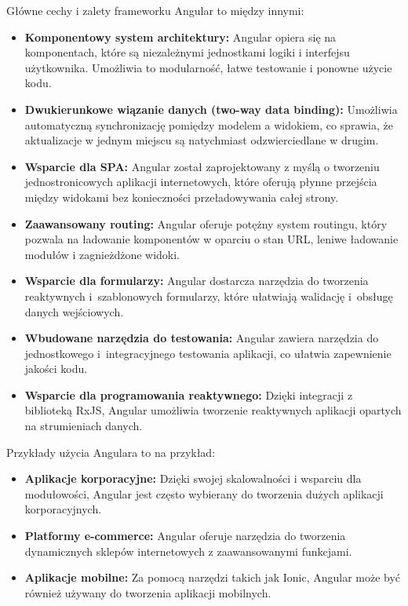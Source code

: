 Główne cechy i zalety frameworku Angular to między innymi:
\begin{itemize}
\item \textbf{Komponentowy system architektury:} Angular opiera się na komponentach, które są niezależnymi jednostkami logiki i interfejsu użytkownika. Umożliwia to modularność, łatwe testowanie i ponowne użycie kodu.

\item \textbf{Dwukierunkowe wiązanie danych (two-way data binding):} Umożliwia automatyczną synchronizację pomiędzy modelem a widokiem, co sprawia, że aktualizacje w jednym miejscu są natychmiast odzwierciedlane w drugim.

\item \textbf{Wsparcie dla SPA:} Angular został zaprojektowany z myślą o tworzeniu jednostronicowych aplikacji internetowych, które oferują płynne przejścia między widokami bez konieczności przeładowywania całej strony.

\item \textbf{Zaawansowany routing:} Angular oferuje potężny system routingu, który pozwala na ładowanie komponentów w oparciu o stan URL, leniwe ładowanie modułów i zagnieżdżone widoki.

\item \textbf{Wsparcie dla formularzy:} Angular dostarcza narzędzia do tworzenia reaktywnych i~szablonowych formularzy, które ułatwiają walidację i~obsługę danych wejściowych.

\item \textbf{Wbudowane narzędzia do testowania:} Angular zawiera narzędzia do jednostkowego i~integracyjnego testowania aplikacji, co ułatwia zapewnienie jakości kodu.

\item \textbf{Wsparcie dla programowania reaktywnego:} Dzięki integracji z biblioteką RxJS, Angular umożliwia tworzenie reaktywnych aplikacji opartych na strumieniach danych.
\end{itemize}

Przykłady użycia Angulara to na przykład:
\begin{itemize}
\item \textbf{Aplikacje korporacyjne:} Dzięki swojej skalowalności i wsparciu dla modułowości, Angular jest często wybierany do tworzenia dużych aplikacji korporacyjnych.

\item \textbf{Platformy e-commerce:} Angular oferuje narzędzia do tworzenia dynamicznych sklepów internetowych z zaawansowanymi funkcjami.

\item \textbf{Aplikacje mobilne:} Za pomocą narzędzi takich jak Ionic, Angular może być również używany do tworzenia aplikacji mobilnych.
\end{itemize}


